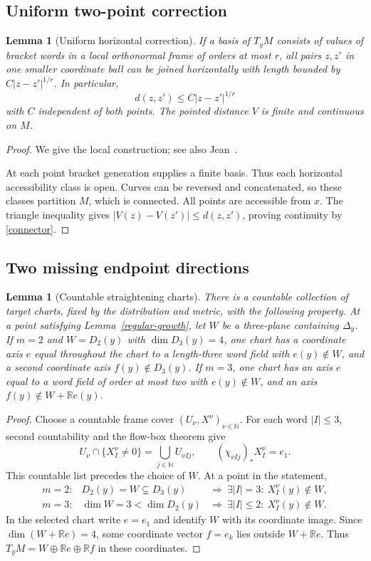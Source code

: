 \documentclass[11pt,letterpaper]{article}
\newcounter{proofgroup}
\newcommand{\proofsection}[1]{\stepcounter{proofgroup}\subsection{#1}}
\newtheorem{lemma}[theorem]{Lemma}
\newcommand{\R}{\mathbb R}
\begin{document}
\proofsection{Uniform two-point correction}\label{repair}
\begin{lemma}[Uniform horizontal correction]\label{two-point}
If a basis of $T_yM$ consists of values of bracket words in a local
orthonormal frame of orders at most $r$, all pairs $z,z'$ in one
smaller coordinate ball can be joined horizontally with length bounded by
$C|z-z'|^{1/r}$. In particular,
\begin{equation}\label{connector}
 d(z,z')\le C |z-z'|^{1/r}
\end{equation}
with $C$ independent of both points. The pointed distance $V$ is finite
and continuous on $M$.
\end{lemma}
\begin{proof}
We give the local construction; see also Jean~\cite{jean}.

At each point bracket generation supplies a finite basis. Thus each
horizontal accessibility class is open. Curves can be reversed and
concatenated, so these classes partition $M$, which is connected.
All points are accessible from $x$. The triangle inequality gives
$|V(z)-V(z')|\le d(z,z')$, proving continuity by \eqref{connector}.
\end{proof}

\proofsection{Two missing endpoint directions}\label{two}
\begin{lemma}[Countable straightening charts]\label{straighten}
There is a countable collection of target charts, fixed by the distribution
and metric, with the following property. At a point satisfying
Lemma~\ref{regular-growth}, let $W$ be a three-plane containing $\Delta_y$.
If $m=2$ and $W=D_2(y)$ with $\dim D_3(y)=4$, one chart has a coordinate
axis $e$ equal throughout the chart to a length-three word field with
$e(y)\notin W$, and a second coordinate axis $f(y)\notin D_3(y)$.
If $m=3$, one chart has an axis $e$ equal to a word field of order at
most two with $e(y)\notin W$, and an axis $f(y)\notin W+\R e(y)$.
\end{lemma}
\begin{proof}
Choose a countable frame cover $(U_\nu,X^\nu)_{\nu\in\mathbb N}$. For each
word $|I|\le3$, second countability and the flow-box theorem give
\[
 U_\nu\cap\{X_I^\nu\ne0\}=\bigcup_{j\in\mathbb N}U_{\nu Ij},
 \qquad(\chi_{\nu Ij})_*X_I^\nu=e_1 .
\]
This countable list precedes the choice of $W$. At a point in the statement,
\[
 \begin{array}{lll}
 m=2:&D_2(y)=W\subsetneq D_3(y)
      &\Rightarrow\ \exists |I|=3:\ X_I^\nu(y)\notin W,\\
 m=3:&\dim W=3<\dim D_2(y)
      &\Rightarrow\ \exists |I|\le2:\ X_I^\nu(y)\notin W .
 \end{array}
\]
In the selected chart write $e=e_1$ and identify $W$ with its coordinate
image. Since $\dim(W+\R e)=4$, some coordinate vector $f=e_k$ lies outside
$W+\R e$. Thus $T_yM=W\oplus\R e\oplus\R f$ in these coordinates.
\end{proof}
\end{document}

